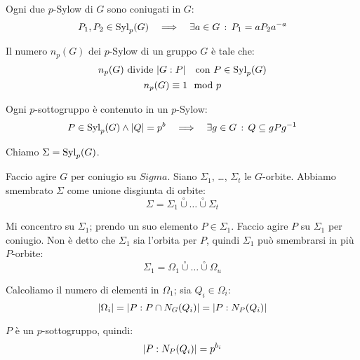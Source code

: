 \begin{teorema}
    Ogni due $p$-Sylow di $G$ sono coniugati in $G$:
    \begin{equation*}
        P_1, P_2 \in \operatorname{Syl}_p(G) \quad\Longrightarrow\quad \exists a \in G \,:\, P_1 = a P_2 a^{-a}
    \end{equation*}

    Il numero $n_p(G)$ dei $p$-Sylow di un gruppo $G$ è tale che:
    \begin{gather*}
        n_p(G) \text{ divide } \lvert G:P \rvert \quad \text{con } P \in \operatorname{Syl}_p(G) \\
        n_p(G) \equiv 1 \mod p
    \end{gather*}

    Ogni $p$-sottogruppo è contenuto in un $p$-Sylow:
    \begin{equation*}
        P \in \operatorname{Syl}_p(G) \land \lvert Q \rvert = p^b \quad\Longrightarrow\quad \exists g \in G \,:\, Q \subseteq gPg^{-1}
    \end{equation*}
\end{teorema}
\begin{dimostrazione}
    Chiamo $\Sigma = \operatorname{Syl}_p(G)$.

    Faccio agire $G$ per coniugio su $Sigma$.
    Siano $\Sigma_1$, \dots, $\Sigma_t$ le $G$-orbite.
    Abbiamo smembrato $\Sigma$ come unione disgiunta di orbite:
    \begin{equation*}
        \Sigma = \Sigma_1 \overset{\circ}{\cup} \dots \overset{\circ}{\cup} \Sigma_t
    \end{equation*}

    Mi concentro su $\Sigma_1$;
    prendo un suo elemento $P \in \Sigma_1$.
    Faccio agire $P$ su $\Sigma_1$ per coniugio.
    Non è detto che $\Sigma_1$ sia l'orbita per $P$, quindi $\Sigma_1$ può smembrarsi in più $P$-orbite:
    \begin{equation*}
        \Sigma_1 = \Omega_1 \overset{\circ}{\cup} \dots \overset{\circ}{\cup} \Omega_u
    \end{equation*}

    Calcoliamo il numero di elementi in $\Omega_1$;
    sia $Q_i \in \Omega_i$:
    \begin{equation*}
        \lvert \Omega_i \rvert = \lvert P:P \cap N_G(Q_i) \rvert = \lvert P:N_P(Q_i) \rvert
    \end{equation*}

    $P$ è un $p$-sottogruppo, quindi:
    \begin{equation*}
        \lvert P:N_P(Q_i) \rvert = p^{b_i}
    \end{equation*}
\end{dimostrazione}